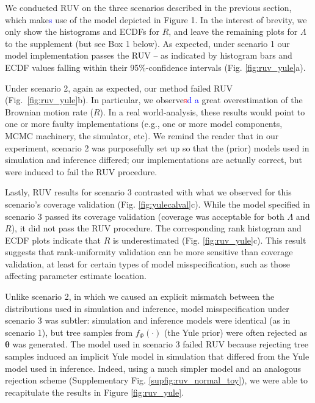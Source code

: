 \documentclass[oneside]{article}
\begin{document}
We conducted RUV on the three scenarios described in the previous section, which make\textcolor{blue}{s} use of the model depicted in Figure 1.
In the interest of brevity, we only show the histograms and ECDFs for $R$, and leave the remaining plots for $\Lambda$ to the supplement (but see Box 1 below).
As expected, under scenario 1 our model implementation passes the RUV -- as indicated by histogram bars and ECDF values falling within their 95\%-confidence intervals (Fig. \ref{fig:ruv_yule}a).

Under scenario 2, again as expected, our method failed RUV (Fig.~\ref{fig:ruv_yule}b).
In particular, we observe\textcolor{red}{\st{s}}\textcolor{blue}{d a} great overestimation of the Brownian motion rate ($R$).
In a real world-analysis, these results would point to one or more faulty implementations (e.g., one or more model components, MCMC machinery, the simulator, etc).
We remind the reader that in our experiment, scenario 2 was purposefully set up so that the (prior) models used in simulation and inference differed; our implementations are actually correct, but were induced to fail the RUV procedure.

Lastly, RUV results for scenario 3 contrasted with what we observed for this scenario's coverage validation (Fig. \ref{fig:yulecalval}c).
While the model specified in scenario 3 passed its coverage validation (coverage was acceptable for both $\Lambda$ and $R$), it did not pass the RUV procedure.
The corresponding rank histogram and ECDF plots indicate that $R$ is underestimated (Fig. \ref{fig:ruv_yule}c).
This result suggests that rank-uniformity validation can be more sensitive than coverage validation, at least for certain types of model misspecification, such as those affecting parameter estimate location.

Unlike scenario 2, in which we caused an explicit mismatch between the distributions used in simulation and inference, model misspecification under scenario 3 was subtler: simulation and inference models were identical (as in scenario 1), but tree samples from $f_\Phi(\cdot)$ (the Yule prior) were often rejected as $\boldsymbol{\theta}$ was generated.
The model used in scenario 3 failed RUV because rejecting tree samples induced an implicit Yule model in simulation that differed from the Yule model used in inference. 
Indeed, using a much simpler model and an analogous rejection scheme (Supplementary Fig. \ref{supfig:ruv_normal_toy}), we were able to recapitulate the results in Figure \ref{fig:ruv_yule}.
\end{document}
